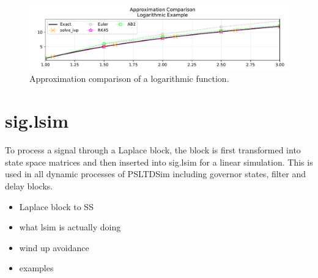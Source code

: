 \documentclass[12pt]{report}
\begin{document}
\begin{figure}[H]
	\centering
	\footnotesize
	\includegraphics[width=\linewidth]{numTech/logEx}
	\caption{Approximation comparison of a logarithmic function.}
	\label{fig: log ex}
\end{figure}


\section{sig.lsim}
To process a signal through a Laplace block, the block is first transformed into state space matrices and then inserted into sig.lsim for a linear simulation.
This is used in all dynamic processes of PSLTDSim including governor states, filter and delay blocks.
\begin{itemize}
\item Laplace block to SS
\item what lsim is actually doing
\item wind up avoidance
\item examples
\end{itemize}

\end{document}
